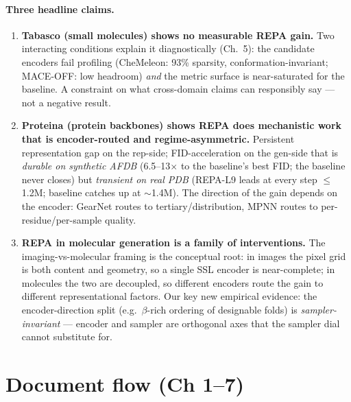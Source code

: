 \documentclass[11pt,a4paper]{article}
\begin{document}
\paragraph{Three headline claims.}
\begin{enumerate}[leftmargin=*,itemsep=2pt]
\item \textbf{Tabasco (small molecules) shows no measurable REPA gain.} Two
interacting conditions explain it diagnostically (Ch.~5): the candidate
encoders fail profiling (CheMeleon: 93\% sparsity, conformation-invariant;
MACE-OFF: low headroom) \emph{and} the metric surface is near-saturated for
the baseline. A constraint on what cross-domain claims can responsibly say
--- not a negative result.
\item \textbf{Proteina (protein backbones) shows REPA does mechanistic work
that is encoder-routed and regime-asymmetric.} Persistent representation
gap on the rep-side; FID-acceleration on the gen-side that is
\emph{durable on synthetic AFDB} (6.5--13$\times$ to the baseline's best
FID; the baseline never closes) but \emph{transient on real PDB} (REPA-L9
leads at every step $\le$1.2M; baseline catches up at $\sim$1.4M). The
direction of the gain depends on the encoder: GearNet routes to
tertiary/distribution, MPNN routes to per-residue/per-sample quality.
\item \textbf{REPA in molecular generation is a family of interventions.} The
imaging-vs-molecular framing is the conceptual root: in images the pixel
grid is both content and geometry, so a single SSL encoder is
near-complete; in molecules the two are decoupled, so different encoders
route the gain to different representational factors. Our key new
empirical evidence: the encoder-direction split (e.g.\ $\beta$-rich
ordering of designable folds) is \emph{sampler-invariant} --- encoder and
sampler are orthogonal axes that the sampler dial cannot substitute for.
\end{enumerate}

\section{Document flow (Ch 1--7)}
\end{document}
